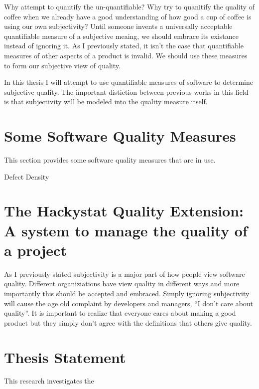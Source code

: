 Why attempt to quantify the un-quantifiable? Why try to quanitify the
quality of coffee when we already have a good understanding of how good a
cup of coffee is using our own subjectivity? Until someone invents a universally
acceptable quantifiable measure of a subjective meaing, we should embrace its
existance instead of ignoring it. As I previously stated, it isn't the case 
that quantifiable measures of other aspects of a product is invalid. We
should use these measures to form our subjective view of quality.

In this thesis I will attempt to use quantifiable measures of software to
determine subjective quality. The important distiction between previous
works in this field is that subjectivity will be modeled into the quality
measure itself.


\section{Some Software Quality Measures}
This section provides some software quality measures that are in use.

Defect Density

\section{The Hackystat Quality Extension: A system to manage the quality of a
project}
As I previously stated subjectivity is a major part of how people view
software quality. Different organiziations have view quality in different
ways and more importantly this should be accepted and embraced. Simply
ignoring subjectivity will cause the age old complaint by developers and
managers, ``I don't care about quality''. It is important to realize that
everyone cares about making a good product but they simply don't agree with 
the definitions that others give quality.


\section{Thesis Statement}
This research investigates the 


















